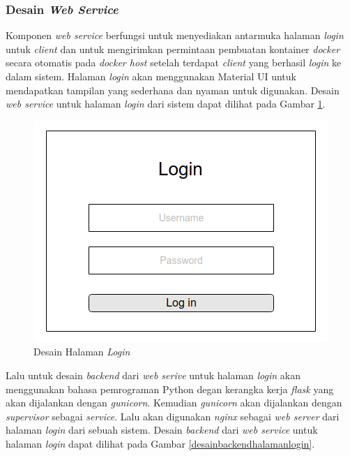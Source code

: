 	\subsubsection{Desain \textit{Web Service}}
	Komponen \textit{web service} berfungsi untuk menyediakan antarmuka halaman \textit{login} untuk \textit{client} dan untuk mengirimkan permintaan pembuatan kontainer \textit{docker} secara otomatis pada \textit{docker host} setelah terdapat \textit{client} yang berhasil \textit{login} ke dalam sistem. Halaman \textit{login} akan menggunakan Material UI untuk mendapatkan tampilan yang sederhana dan nyaman untuk digunakan. Desain \textit{web service} untuk halaman \textit{login} dari sistem dapat dilihat pada Gambar \ref{mockuplogin}.
	
	\begin{figure}[H]
		\centering
		\includegraphics[width=\linewidth]{images/bab3/MockupLogin}
		\caption{Desain Halaman \textit{Login}}
		\label{mockuplogin}
	\end{figure}
	
	Lalu untuk desain \textit{backend} dari \textit{web serive} untuk halaman \textit{login} akan menggunakan bahasa pemrograman Python degan kerangka kerja \textit{flask} yang akan dijalankan dengan \textit{gunicorn}. Kemudian \textit{gunicorn} akan dijalankan dengan \textit{supervisor} sebagai \textit{service}. Lalu akan digunakan \textit{nginx} sebagai \textit{web server} dari halaman \textit{login} dari sebuah sistem. Desain \textit{backend} dari \textit{web service} untuk halaman \textit{login} dapat dilihat pada Gambar \ref{desainbackendhalamanlogin}.
	
